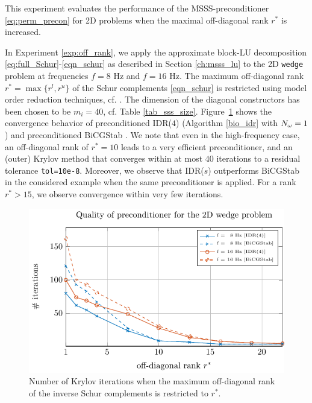 \begin{exper} \label{exp:off_rank}
This experiment evaluates the performance of the MSSS-preconditioner \eqref{eq:perm_precon} for 2D problems when the maximal off-diagonal rank $r^\ast$ is in\-creased. 
\end{exper}
In Experiment \ref{exp:off_rank}, we apply the approximate block-LU decomposition \eqref{eq:full_Schur}-\eqref{eqn_schur} as described in Section \ref{ch:msss_lu} to the 2D \texttt{wedge} problem at frequencies $f=8$ Hz and $f=16$ Hz. The maximum off-diagonal rank $r^\ast = \max \{ r^l, r^u\}$ of the Schur complements \eqref{eqn_schur} is restricted using model order reduction techniques, cf. \cite{QG15}. The dimension of the diagonal constructors has been chosen to be $m_i = 40$, cf. Table \ref{tab_sss_size}. Figure~\ref{fig:exp1} shows the convergence behavior of preconditioned  IDR($4$) (Algorithm \ref{bio_idr} with ${N_{\omega}} =1$) and preconditioned BiCGStab \cite{v92}. We note that even in the high-frequency case, an off-di\-ag\-o\-nal rank of $r^\ast = 10$ leads to a very efficient preconditioner, and an (outer) Krylov method that converges within at most $40$ iterations to a residual tolerance \texttt{tol=10e-8}. Moreover, we observe that IDR($s$) outperforms BiCGStab in the considered example when the same preconditioner is applied. For a rank $r^\ast > 15$, we observe convergence within very few iterations.
\begin{figure}[H]
  \includegraphics[width=\columnwidth]{order_2d_new.pdf}  
\caption{Number of Krylov iterations when the maximum off-diagonal rank of the inverse Schur complements is restricted to $r^\ast$.}
\label{fig:exp1}
\end{figure}

